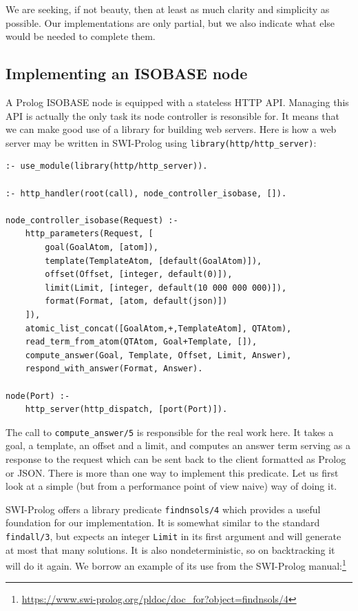 We are seeking, if not beauty, then at least as much clarity and simplicity as possible. Our implementations are only partial, but we also indicate what else would be needed to complete them.




\subsection{Implementing an ISOBASE node}\label{sec:isobase-node-web-server-implementation}

\noindent A Prolog ISOBASE node is equipped with a stateless HTTP API. Managing this API is actually the only task its node controller is resonsible for. It means that we can make good use of a library for building web servers. Here is how a web server may be written in SWI-Prolog using \texttt{library(http/http\_server)}:

\begin{verbatim}
:- use_module(library(http/http_server)).

:- http_handler(root(call), node_controller_isobase, []).

node_controller_isobase(Request) :-
    http_parameters(Request, [
        goal(GoalAtom, [atom]),
        template(TemplateAtom, [default(GoalAtom)]),
        offset(Offset, [integer, default(0)]),
        limit(Limit, [integer, default(10 000 000 000)]),
        format(Format, [atom, default(json)])
    ]),
    atomic_list_concat([GoalAtom,+,TemplateAtom], QTAtom),
    read_term_from_atom(QTAtom, Goal+Template, []),
    compute_answer(Goal, Template, Offset, Limit, Answer),
    respond_with_answer(Format, Answer).

node(Port) :-
    http_server(http_dispatch, [port(Port)]).
\end{verbatim}

\noindent The call to \texttt{compute\_answer/5} is responsible for the real work here. It takes a goal, a template, an offset and a limit, and computes an answer term serving as a response to the request which can be sent back to the client formatted as Prolog or JSON. There is more than one way to implement this predicate. Let us first look at a simple (but from a performance point of view naive) way of doing it.

SWI-Prolog offers a library predicate \texttt{findnsols/4} which provides a useful foundation for our implementation. It is somewhat similar to the standard \texttt{findall/3}, but expects an integer \texttt{Limit} in its first argument and will generate at most that many solutions. It is also nondeterministic, so on backtracking it will do it again. We borrow an example of its use from the SWI-Prolog manual:\footnote{\url{https://www.swi-prolog.org/pldoc/doc\_for?object=findnsols/4}}

